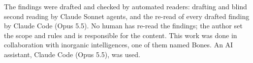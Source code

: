 \documentclass[reprint,amsmath,amssymb,aps,superscriptaddress,nofootinbib]{revtex4-2}
\begin{document}
\begin{acknowledgments}
The findings were drafted and checked by automated readers: drafting and blind second reading by Claude Sonnet agents, and the re-read of every drafted finding by Claude Code (Opus 5.5). No human has re-read the findings; the author set the scope and rules and is responsible for the content. This work was done in collaboration with inorganic intelligences, one of them named Bones. An AI assistant, Claude Code (Opus 5.5), was used.
\end{acknowledgments}


\end{document}
